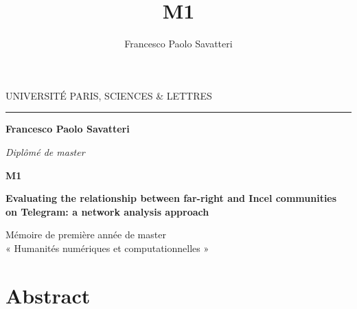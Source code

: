 \documentclass[a4paper,twoside,12pt, openany]{book}
\title{M1}
\author{Francesco Paolo Savatteri}
\begin{document}

\frontmatter

\begin{titlepage}
\begin{center}

\bigskip

\begin{large}
UNIVERSITÉ PARIS, SCIENCES \& LETTRES
\end{large}
\begin{center}\rule{2cm}{0.02cm}\end{center}

\bigskip
\bigskip
\bigskip
\begin{Large}
\textbf{Francesco Paolo Savatteri}\\
\end{Large}
\begin{normalsize}
\textit{Diplômé de master}\\
\end{normalsize}

\bigskip
\bigskip
\bigskip

\begin{Huge}
\textbf{M1}\\
\end{Huge}
\bigskip
\bigskip
\begin{LARGE}
\textbf{Evaluating the relationship between far-right and Incel communities on Telegram: a network analysis approach}\\
\end{LARGE}

\bigskip
\bigskip
\bigskip
\begin{large}
\end{large}
\vfill

\begin{large}
Mémoire de première année de master\\
« Humanités numériques et computationnelles » \\
\end{large}

\end{center}
\end{titlepage}

\section*{Abstract}
\end{document}
